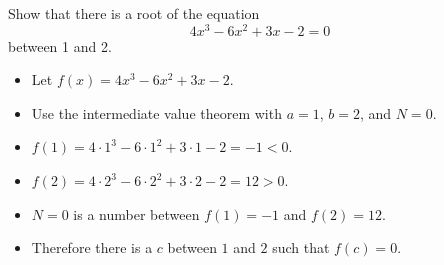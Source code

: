 \begin{frame}
\begin{example}[Example 9, p. 120]
Show that there is a root of the equation
\[
4x^3 - 6x^2 + 3x - 2 = 0
\]
between 1 and 2.
\begin{itemize}
\item<2->  Let $f(x) = 4x^3 - 6x^2 + 3x - 2$.
\item<3->  Use the intermediate value theorem with $a = 1$, $b = 2$, and $N = 0$.
\item<4->  $f(1) = 4\cdot 1^3 - 6\cdot 1^2 + 3\cdot 1 - 2 = -1 < 0$.
\item<5->  $f(2) = 4\cdot 2^3 - 6\cdot 2^2 + 3\cdot 2 - 2 = 12 > 0$.
\item<6->  $N = 0$ is a number between $f(1) = -1$ and $f(2) = 12$.
\item<7->  Therefore there is a $c$ between $1$ and $2$ such that $f(c) = 0$.
\end{itemize}
\end{example}
\end{frame}

